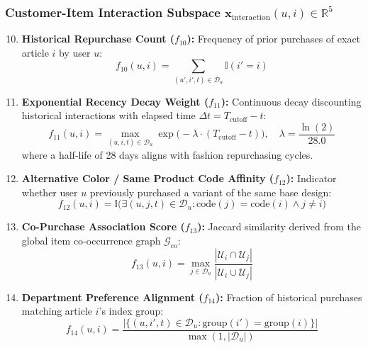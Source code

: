 \subsubsection{Customer-Item Interaction Subspace $\mathbf{x}_{\text{interaction}}(u, i) \in \mathbb{R}^5$}
\begin{enumerate}
    \setcounter{enumi}{9}
    \item \textbf{Historical Repurchase Count ($f_{10}$):} Frequency of prior purchases of exact article $i$ by user $u$:
    \begin{equation}
        f_{10}(u, i) = \sum_{(u', i', t) \in \mathcal{D}_u} \mathbb{I}(i' = i)
    \end{equation}
    \item \textbf{Exponential Recency Decay Weight ($f_{11}$):} Continuous decay discounting historical interactions with elapsed time $\Delta t = T_{\text{cutoff}} - t$:
    \begin{equation}
        f_{11}(u, i) = \max_{(u, i, t) \in \mathcal{D}_u} \exp\big(-\lambda \cdot (T_{\text{cutoff}} - t)\big), \quad \lambda = \frac{\ln(2)}{28.0}
    \end{equation}
    where a half-life of 28 days aligns with fashion repurchasing cycles.
    \item \textbf{Alternative Color / Same Product Code Affinity ($f_{12}$):} Indicator whether user $u$ previously purchased a variant of the same base design:
    \begin{equation}
        f_{12}(u, i) = \mathbb{I}\big(\exists (u, j, t) \in \mathcal{D}_u : \text{code}(j) = \text{code}(i) \land j \neq i\big)
    \end{equation}
    \item \textbf{Co-Purchase Association Score ($f_{13}$):} Jaccard similarity derived from the global item co-occurrence graph $\mathcal{G}_{\text{co}}$:
    \begin{equation}
        f_{13}(u, i) = \max_{j \in \mathcal{D}_u} \frac{|\mathcal{U}_i \cap \mathcal{U}_j|}{|\mathcal{U}_i \cup \mathcal{U}_j|}
    \end{equation}
    \item \textbf{Department Preference Alignment ($f_{14}$):} Fraction of historical purchases matching article $i$'s index group:
    \begin{equation}
        f_{14}(u, i) = \frac{|\{(u, i', t) \in \mathcal{D}_u : \text{group}(i') = \text{group}(i)\}|}{\max(1, |\mathcal{D}_u|)}
    \end{equation}
\end{enumerate}

